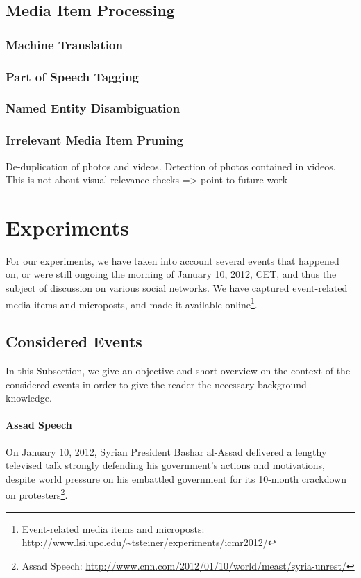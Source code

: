 \documentclass{acm_proc_article-sp}
\newcommand{\inlinelistingsize}{\fontsize{8pt}{11pt}}
\let\oldurl\url
\renewcommand{\url}[1]{\inlinelistingsize\oldurl{#1}}
\begin{document}
\subsection{Media Item Processing}

\subsubsection{Machine Translation}

\subsubsection{Part of Speech Tagging}

\subsubsection{Named Entity Disambiguation}

\subsubsection{Irrelevant Media Item Pruning}
De-duplication of photos and videos.
Detection of photos contained in videos.
This is not about visual relevance checks => point to future work

\section{Experiments}
For our experiments, we have taken into account several events that happened on, or were still ongoing the morning of January 10, 2012, CET, and thus the subject of discussion on various social networks.
We have captured event-related media items and microposts, and made it available online\footnote{Event-related media items and microposts: \url{http://www.lsi.upc.edu/~tsteiner/experiments/icmr2012/}}. 

\subsection{Considered Events}
In this Subsection, we give an objective and short overview on the context of the considered events in order to give the reader the necessary background knowledge.

\paragraph{Assad Speech}
On January 10, 2012, Syrian President Bashar al-Assad delivered a lengthy televised talk strongly defending his government's actions and motivations, despite world pressure on his embattled government for its 10-month crackdown on protesters\footnote{Assad Speech: \url{http://www.cnn.com/2012/01/10/world/meast/syria-unrest/}}. 
\end{document}
